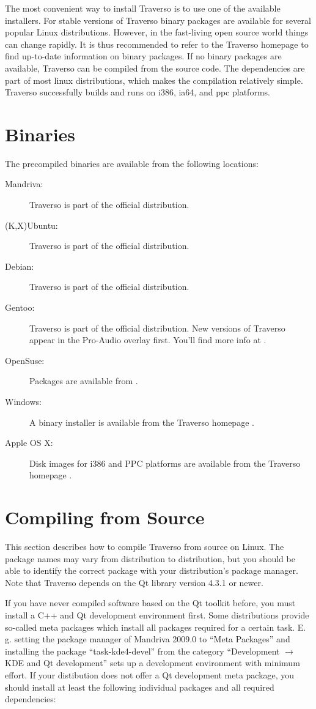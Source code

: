 The most convenient way to install Traverso is to use one of the available installers. For stable versions of Traverso binary packages are available for several popular Linux distributions. However, in the fast-living open source world things can change rapidly. It is thus recommended to refer to the Traverso homepage \cite{trav-hp} to find up-to-date information on binary packages. If no binary packages are available, Traverso can be compiled from the source code. The dependencies are part of most linux distributions, which makes the compilation relatively simple. Traverso successfully builds and runs on i386, ia64, and ppc platforms.

\section{Binaries}
The precompiled binaries are available from the following locations:

\begin{description}
	\item [Mandriva:] Traverso is part of the official distribution.
	\item [(K,X)Ubuntu:] Traverso is part of the official distribution.
	\item [Debian:] Traverso is part of the official distribution.
	\item [Gentoo:] Traverso is part of the official distribution. New versions of Traverso appear in the Pro-Audio overlay first. You'll find more info at \cite{pro-audio-wiki}.
	\item [OpenSuse:] Packages are available from \cite{suse-ref}.
	\item [Windows:] A binary installer is available from the Traverso homepage \cite{trav-hp}.
	\item [Apple OS X:] Disk images for i386 and PPC platforms are available from the Traverso homepage \cite{trav-hp}.
\end{description}

\section{Compiling from Source}
This section describes how to compile Traverso from source on Linux. The package names may vary from distribution to distribution, but you should be able to identify the correct package with your distribution's package manager. Note that Traverso depends on the Qt library version 4.3.1 or newer.

If you have never compiled software based on the Qt toolkit before, you must install a C++ and Qt development environment first. Some distributions provide so-called meta packages which install all packages required for a certain task. E.\,g. setting the package manager of Mandriva 2009.0 to ``Meta Packages'' and installing the package ``task-kde4-devel'' from the category ``Development $\rightarrow$ KDE and Qt development'' sets up a development environment with minimum effort. If your distibution does not offer a Qt development meta package, you should install at least the following individual packages and all required dependencies:

